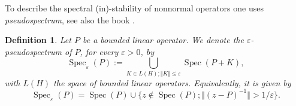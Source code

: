 \documentclass[reqno,12pt,letterpaper]{amsart}
\newtheorem{defi}[theo]{Definition}
\numberwithin{equation}{section}
\DeclareMathOperator{\Spec}{Spec}
\begin{document}

 
To describe the spectral (in)-stability of nonnormal operators one uses \emph{pseudospectrum}, see also the book \cite[Theo. 10.2]{ET05}.
\begin{defi}
Let $P$ be a bounded linear operator. We denote the \emph{$\varepsilon$-pseudospectrum} of $P$, for every $\varepsilon>0$, by
\begin{equation}
\label{eq:perturbed}
 \Spec_{\varepsilon}(P) := \bigcup_{K \in L(H); \Vert K \Vert \le \varepsilon}  \Spec(P+K),
 \end{equation}
with $L(H)$ the space of bounded linear operators. Equivalently, it is given by
\begin{equation}
\label{eq:pseudo_spec}
\Spec_{\varepsilon}(P) = \Spec(P) \cup \{ z \notin \Spec(P); \Vert (z-P)^{-1} \Vert >1/\varepsilon\}.
\end{equation}
\end{defi}
\end{document}
